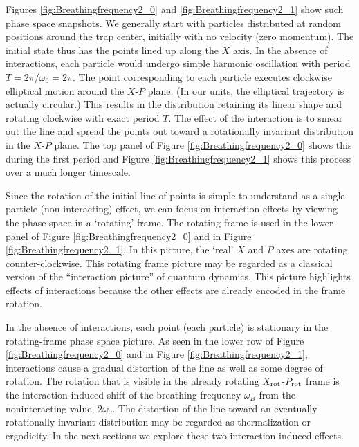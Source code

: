 \documentclass[a4paper, onecolumn]{revtex4-1}
\begin{document}
Figures \ref{fig:Breathingfrequency2_0} and \ref{fig:Breathingfrequency2_1} show such phase space
snapshots.  We generally start with particles distributed at random positions around the trap
center, initially with no velocity (zero momentum).  The initial state thus has the points lined up
along the $X$ axis.  In the absence of interactions, each particle would undergo simple harmonic
oscillation with period $T=2\pi/\omega_0 = 2\pi$.  The point corresponding to each particle executes
clockwise elliptical motion around the $X$-$P$ plane.  (In our units, the elliptical trajectory is
actually circular.)  This results in the distribution retaining its linear shape and rotating
clockwise with exact period $T$.  The effect of the interaction is to smear out the line and spread
the points out toward a rotationally invariant distribution in the $X$-$P$ plane.  The top panel of
Figure \ref{fig:Breathingfrequency2_0} shows this during the first period and Figure
\ref{fig:Breathingfrequency2_1} shows this process over a much longer timescale.

Since the rotation of the initial line of points is simple to understand as a single-particle
(non-interacting) effect, we can focus on interaction effects by viewing the phase space in a
`rotating' frame.  The rotating frame is used in the lower panel of Figure
\ref{fig:Breathingfrequency2_0} and in Figure \ref{fig:Breathingfrequency2_1}.  In this picture, the
`real' $X$ and $P$ axes are rotating counter-clockwise.  This rotating frame picture may be regarded
as a classical version of the ``interaction picture'' of quantum dynamics.  This picture highlights
effects of interactions because the other effects are already encoded in the frame rotation.

In the absence of interactions, each point (each particle) is stationary in the rotating-frame phase
space picture.  As seen in the lower row of Figure \ref{fig:Breathingfrequency2_0} and in Figure
\ref{fig:Breathingfrequency2_1}, interactions cause a gradual distortion of the line as well as some
degree of rotation.
%
The rotation that is visible in the already rotating $X_{\rm rot}$-$P_{\rm rot}$ frame is the
interaction-induced shift of the breathing frequency $\omega_B$ from the noninteracting value,
$2\omega_0$.  The distortion of the line toward an eventually rotationally invariant distribution
may be regarded as thermalization or ergodicity.  In the next sections we explore these two
interaction-induced effects.
\end{document}
